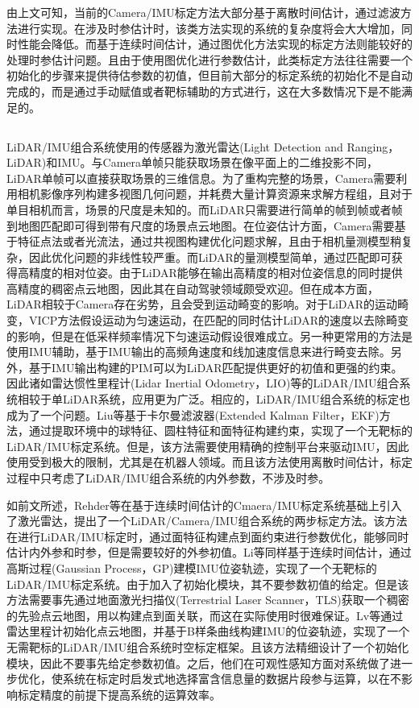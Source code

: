 由上文可知，当前的Camera/IMU标定方法大部分基于离散时间估计，通过滤波方法进行实现。在涉及时参估计时，该类方法实现的系统的复杂度将会大大增加，同时性能会降低。而基于连续时间估计，通过图优化方法实现的标定方法则能较好的处理时参估计问题。且由于使用图优化进行参数估计，此类标定方法往往需要一个初始化的步骤来提供待估参数的初值，但目前大部分的标定系统的初始化不是自动完成的，而是通过手动赋值或者靶标辅助的方式进行，这在大多数情况下是不能满足的。

\subsection{}
LiDAR/IMU组合系统使用的传感器为激光雷达(Light Detection and Ranging，LiDAR)和IMU。与Camera单帧只能获取场景在像平面上的二维投影不同，LiDAR单帧可以直接获取场景的三维信息。为了重构完整的场景，Camera需要利用相机影像序列构建多视图几何问题，并耗费大量计算资源来求解方程组，且对于单目相机而言，场景的尺度是未知的。而LiDAR只需要进行简单的帧到帧或者帧到地图匹配即可得到带有尺度的场景点云地图。在位姿估计方面，Camera需要基于特征点法或者光流法，通过共视图构建优化问题求解，且由于相机量测模型稍复杂，因此优化问题的非线性较严重\cite{高翔2017视觉}。而LiDAR的量测模型简单，通过匹配即可获得高精度的相对位姿。由于LiDAR能够在输出高精度的相对位姿信息的同时提供高精度的稠密点云地图，因此其在自动驾驶领域颇受欢迎。但在成本方面，LiDAR相较于Camera存在劣势，且会受到运动畸变的影响。对于LiDAR的运动畸变，VICP方法\cite{hong2010vicp}假设运动为匀速运动，在匹配的同时估计LiDAR的速度以去除畸变的影响，但是在低采样频率情况下匀速运动假设很难成立。另一种更常用的方法是使用IMU辅助，基于IMU输出的高频角速度和线加速度信息来进行畸变去除\cite{shan2020lio}。另外，基于IMU输出构建的PIM可以为LiDAR匹配提供更好的初值和更强的约束。因此诸如雷达惯性里程计(Lidar Inertial Odometry，LIO)等的LiDAR/IMU组合系统相较于单LiDAR系统，应用更为广泛。相应的，LiDAR/IMU组合系统的标定也成为了一个问题。Liu等\cite{liu2019novel}基于卡尔曼滤波器(Extended Kalman Filter，EKF)方法，通过提取环境中的球特征、圆柱特征和面特征构建约束，实现了一个无靶标的LiDAR/IMU标定系统。但是，该方法需要使用精确的控制平台来驱动IMU，因此使用受到极大的限制，尤其是在机器人领域。而且该方法使用离散时间估计，标定过程中只考虑了LiDAR/IMU组合系统的内外参数，不涉及时参。

如前文所述，Rehder等\cite{rehder2014spatio}在基于连续时间估计的Cmaera/IMU标定系统\cite{furgale2013unified}基础上引入了激光雷达，提出了一个LiDAR/Camera/IMU组合系统的两步标定方法。该方法在进行LiDAR/IMU标定时，通过面特征构建点到面约束进行参数优化，能够同时估计内外参和时参，但是需要较好的外参初值。Li等\cite{li20213d}同样基于连续时间估计，通过高斯过程(Gaussian Process，GP)建模IMU位姿轨迹，实现了一个无靶标的LiDAR/IMU标定系统。由于加入了初始化模块，其不要参数初值的给定。但是该方法需要事先通过地面激光扫描仪(Terrestrial Laser Scanner，TLS)获取一个稠密的先验点云地图，用以构建点到面关联，而这在实际使用时很难保证。Lv等\cite{lv2020targetless}通过雷达里程计初始化点云地图，并基于B样条曲线构建IMU的位姿轨迹，实现了一个无需靶标的LiDAR/IMU组合系统时空标定框架。且该方法精细设计了一个初始化模块，因此不要事先给定参数初值。之后，他们在可观性感知方面对系统做了进一步优化，使系统在标定时启发式地选择富含信息量的数据片段参与运算，以在不影响标定精度的前提下提高系统的运算效率\cite{lv2022observability}。

